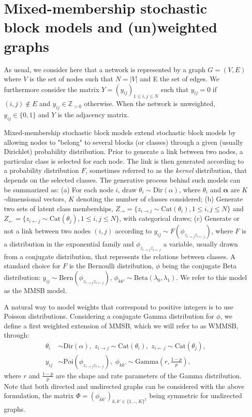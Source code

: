 \section{Mixed-membership stochastic block models and (un)weighted graphs}
\label{sec:model}

As usual, we consider here that a network is represented by a graph $G=(V,E)$ where $V$ is the set of nodes such that $N=|V|$ and E the set of edges. We furthermore consider the matrix $Y=(y_{ij})_{1 \le i,j \le N}$ such that $y_{ij}=0$ if $(i,j) \notin E$ and $y_{ij} \in \mathbb{Z}_{>0}$ otherwise. When the network is unweighted, $y_{ij} \in \{0,1\}$ and $Y$ is the adjacency matrix.

Mixed-membership stochastic block models extend stochastic block models \cite{airoldi2009mixed} by allowing nodes to "belong" to several blocks (or classes) through a given (usually Dirichlet) probability distribution. Prior to generate a link between two nodes, a particular class is selected for each node. The link is then generated according to a probability distribution $F$, sometimes referred to as the \textit{kernel} distribution, that depends on the selected classes. The generative process behind such models can be summarized as: (a) For each node $i$, draw $\theta_i \sim \textrm{Dir}(\alpha)$, where $\theta_i$ and $\boldsymbol{\alpha}$ are $K$-dimensional vectors, $K$ denoting  the number of classes considered; (b) Generate two sets of latent class memberships, $Z_\rightarrow = \{z_{i\rightarrow j} \sim \textrm{Cat}(\theta_i),  1 \le i,j \le N\}$ and $Z_\leftarrow = \{z_{i\leftarrow j} \sim \textrm{Cat}(\theta_j),  1 \le i,j \le N\}$, with categorical draws; (c) Generate or not a link between two nodes $(i,j)$ according to $y_{ij} \sim F(\phi_{z_{i \rightarrow j}z_{i \leftarrow j}})$, where $F$ is a distribution in the exponential family and $\phi_{z_{i \rightarrow j}z_{i \leftarrow j}}$ a variable, usually drawn from a conjugate distribution, that represents the relations between classes. A standard choice for $F$ is the Bernoulli distribution, $\phi$ being the conjugate Beta distribution: $y_{ij} \sim \textrm{Bern}(\phi_{z_{i \rightarrow j}z_{i \leftarrow j}}), \, \phi_{kk'} \sim \textrm{Beta}(\lambda_0, \lambda_1)$. We refer to this model as the MMSB model.

A natural way to model weights that correspond to positive integers is to use Poisson distributions. Considering a conjugate Gamma distribution for $\phi$, we define a first weighted extension of MMSB, which we will refer to as WMMSB, through:
%
\begin{align*} \label{eq:generative}
\theta_i & \sim \textrm{Dir}(\alpha), \,\, z_{i\rightarrow j} \sim \textrm{Cat}(\theta_i), \,\, z_{i\leftarrow j} \sim \textrm{Cat}(\theta_j), \\
y_{ij} &\sim \textrm{Poi}(\phi_{z_{i \rightarrow j}z_{i \leftarrow j}}), \,\, \phi_{kk'} \sim \textrm{Gamma}(r, \frac{1-p}{p}),
\end{align*}
%
where $r$ and $\frac{1-p}{p}$ are the shape and rate parameters of the Gamma distribution. Note that both directed and undirected graphs can be considered with the above formulation, the matrix $\Phi = (\phi_{kk'})_{k,k' \in \{1,..,K\}^2}$ being symmetric for undirected graphs.

